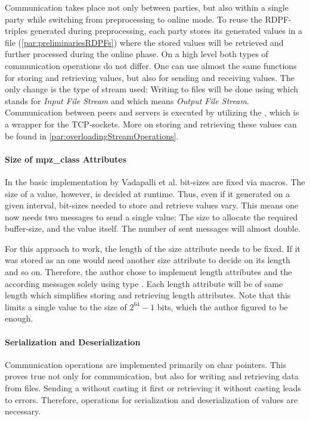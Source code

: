 Communication takes place not only between parties, but also within a single party while switching from preprocessing to online mode.
To reuse the RDPF-triples generated during preprocessing, each party stores its generated values in a file (\ref{par:preliminariesRDPFs}) where the stored values will be retrieved and further processed during the online phase.
On a high level both types of communication operations do not differ.
One can use almost the same functions for storing and retrieving values, but also for sending and receiving values.
The only change is the type of stream used:
Writing to files will be done using  which stands for \textit{Input File Stream} and  which means \textit{Output File Stream}.
Communication between peers and servers is executed by utilizing the , which is a wrapper for the TCP-sockets.
More on storing and retrieving these values can be found in \ref{par:overloadingStreamOperations}.

\paragraph{Size of mpz\_class Attributes}\label{par:sizeOfMPZClassAttributes}
In the basic implementation by Vadapalli et al. bit-sizes are fixed via macros.
The size of a  value, however, is decided at runtime.
Thus, even if it generated on a given interval, bit-sizes needed to store and retrieve values vary.
This means one now needs two messages to send a single  value: The size to allocate the required buffer-size, and the value itself.
The number of sent messages will almost double.

For this approach to work, the length of the size attribute needs to be fixed.
If it was stored as an  one would need another size attribute to decide on its length and so on.
Therefore, the author chose to implement length attributes and the according messages solely using type .
Each length attribute will be of same length which simplifies storing and retrieving length attributes.
Note that this limits a single value to the size of $2^{64}-1$ bits, which the author figured to be enough.

\paragraph{Serialization and Deserialization}\label{par:gmpSerializationAndDeserialization}
Communication operations are implemented primarily on char pointers.
This proves true not only for communication, but also for writing and retrieving data from files.
Sending a  without casting it first or retrieving it without casting leads to errors.
Therefore, operations for serialization and deserialization of  values are necessary.

